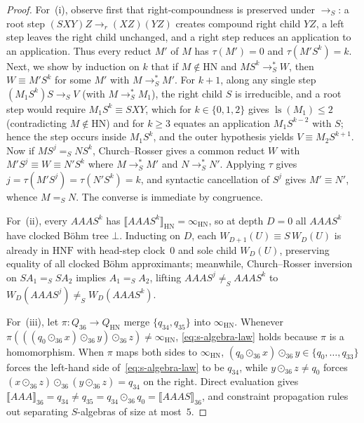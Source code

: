 \documentclass[11pt,reqno]{amsart}
\numberwithin{equation}{section}
\theoremstyle{plain}
\theoremstyle{definition}
\theoremstyle{remark}
\DeclareMathOperator{\ls}{ls}
\newcommand{\HNF}{\mathrm{HNF}}
\newcommand{\HN}{\mathrm{HN}}
\newcommand{\sem}[1]{\llbracket #1 \rrbracket}
\newcommand{\redS}{\to_S}
\newcommand{\redSs}{\to_S^*}
\newcommand{\convS}{=_S}
\begin{document}
\begin{proof}
For~(i), observe first that right-compoundness is preserved under $\redS$: a root step $(S X Y) Z \to_r (X Z)(Y Z)$ creates compound right child $Y Z$, a left step leaves the right child unchanged, and a right step reduces an application to an application. Thus every reduct $M'$ of $M$ has $\tau(M') = 0$ and $\tau(M' S^k) = k$. Next, we show by induction on $k$ that if $M \notin \HN$ and $M S^k \redSs W$, then $W \equiv M' S^k$ for some $M'$ with $M \redSs M'$. For $k + 1$, along any single step $(M_1 S^k) S \redS V$ (with $M \redSs M_1$), the right child $S$ is irreducible, and a root step would require $M_1 S^k \equiv S X Y$, which for $k \in \{0, 1, 2\}$ gives $\ls(M_1) \le 2$ (contradicting $M \notin \HN$) and for $k \ge 3$ equates an application $M_1 S^{k-2}$ with $S$; hence the step occurs inside $M_1 S^k$, and the outer hypothesis yields $V \equiv M_2 S^{k+1}$. Now if $M S^j \convS N S^k$, Church--Rosser gives a common reduct $W$ with $M' S^j \equiv W \equiv N' S^k$ where $M \redSs M'$ and $N \redSs N'$. Applying $\tau$ gives $j = \tau(M' S^j) = \tau(N' S^k) = k$, and syntactic cancellation of $S^j$ gives $M' \equiv N'$, whence $M \convS N$. The converse is immediate by congruence.

For~(ii), every $A A A S^k$ has $\sem{A A A S^k}_{\HN} = \infty_{\HN}$, so at depth $D = 0$ all $A A A S^k$ have clocked B\"ohm tree $\bot$. Inducting on $D$, each $W_{D+1}(U) \equiv S\,W_D(U)$ is already in $\HNF$ with head-step clock~$0$ and sole child $W_D(U)$, preserving equality of all clocked B\"ohm approximants; meanwhile, Church--Rosser inversion on $S A_1 \convS S A_2$ implies $A_1 \convS A_2$, lifting $A A A S^j \neq_S A A A S^k$ to $W_D(A A A S^j) \neq_S W_D(A A A S^k)$.

For~(iii), let $\pi \colon Q_{36} \to Q_{\HN}$ merge $\{q_{34}, q_{35}\}$ into $\infty_{\HN}$. Whenever $\pi(((q_0 \odot_{36} x) \odot_{36} y) \odot_{36} z) \neq \infty_{\HN}$, \eqref{eq:s-algebra-law} holds because $\pi$ is a homomorphism. When $\pi$ maps both sides to $\infty_{\HN}$, $(q_0 \odot_{36} x) \odot_{36} y \in \{q_0, \dots, q_{33}\}$ forces the left-hand side of~\eqref{eq:s-algebra-law} to be $q_{34}$, while $y \odot_{36} z \neq q_0$ forces $(x \odot_{36} z) \odot_{36} (y \odot_{36} z) = q_{34}$ on the right. Direct evaluation gives $\sem{A A A}_{36} = q_{34} \neq q_{35} = q_{34} \odot_{36} q_0 = \sem{A A A S}_{36}$, and constraint propagation rules out separating $S$-algebras of size at most~$5$.
\end{proof}
\end{document}
